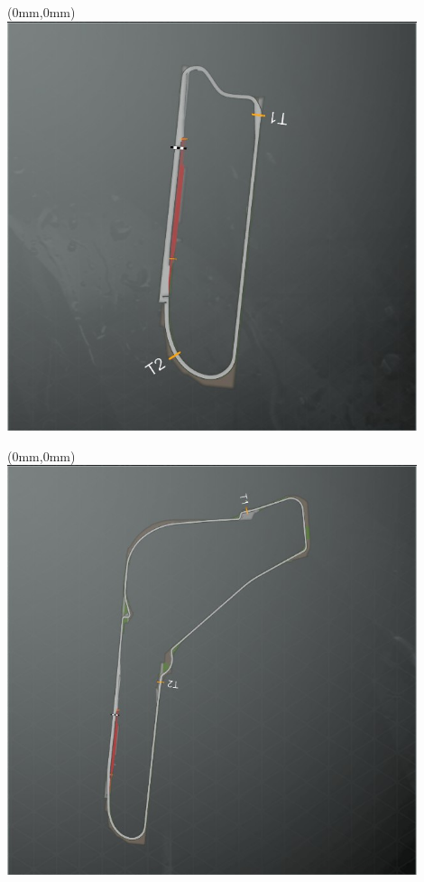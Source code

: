 \null\newpage
\begin{textblock*}{30mm}(0mm,0mm)%
\includegraphics[width=120mm]{TR/2015-05-20_00035.png}
\end{textblock*}
\null\newpage
\begin{textblock*}{30mm}(0mm,0mm)%
\includegraphics[width=120mm]{TR/2015-05-20_00034.png}
\end{textblock*}
